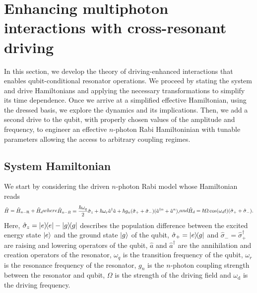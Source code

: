 \section{Enhancing multiphoton interactions with cross-resonant driving}\label{sec:DrivenInt}

In this section, we develop the theory of driving-enhanced interactions that enables qubit-conditional resonator operations. We proceed by stating the system and drive Hamiltonians and applying the necessary transformations to simplify its time dependence. Once we arrive at a simplified effective Hamiltonian, using the dressed basis, we explore the dynamics and its implications. Then, we add a second drive to the qubit, with properly chosen values of the amplitude and frequency, to engineer an effective $n$-photon Rabi Hamiltoninian with tunable parameters allowing the access to arbitrary coupling regimes.

\subsection{System Hamiltonian}
We start by considering the driven $n$-photon Rabi model whose Hamiltonian reads
\begin{subequations}\label{eq:SysHam}
\begin{align}
    \hat{H}=\hat{H}_{n-\text{R}} + \hat{H}_d
\end{align}
where
\begin{align}
    \hat{H}_{n-R}=\frac{\hbar \omega_q}{2}\hat{\sigma}_z+ \hbar\omega_r \hat{a}^\dagger\hat{a} + \hbar g_n(\hat{\sigma}_+ + \hat{\sigma}_-)(\hat{a}^{\dagger n} + \hat{a}^n),
\end{align}
and
\begin{align}
    \hat{H}_d=\hbar\Omega \cos(\omega_d t)(\sigP + \sigM).
\end{align}
\end{subequations}
Here, $\hat{\sigma}_z=\dyad{e}-\dyad{g}$ describes the population difference between the excited energy state $\ket{e}$ and the ground state $\ket{g}$ of the qubit, $\hat{\sigma}_+=\dyad{e}{g}$ and $\hat{\sigma}_-=\hat{\sigma}_+^{\dagger}$ are raising and lowering operators of the qubit, $\hat{a}$ and $\hat{a}^\dagger$ are the annihilation and creation operators of the resonator, $\omega_q$ is the transition frequency of the qubit, $\omega_r$ is the resonance frequency of the resonator, $g_n$  is the $n$-photon coupling strength between the resonator and qubit, $\Omega$ is the strength of the driving field and $\omega_{\text{d}}$ is the driving frequency. 

